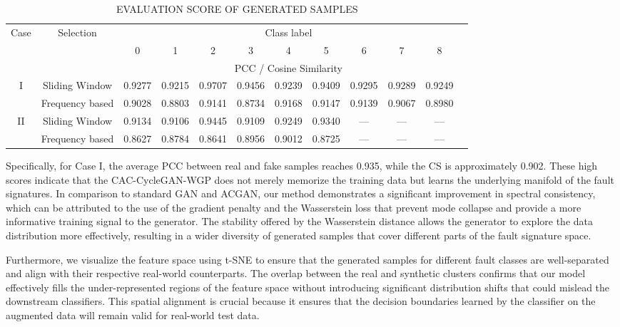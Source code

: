 \documentclass[twocolumn]{IEEEtran}
\begin{document}
\begin{table}[htbp]
\centering
\caption{EVALUATION SCORE OF GENERATED SAMPLES}
\label{tab:similarity}
\begin{tabular}{cccccccccccc}
\hline
\multirow{2}{*}{Case} & \multirow{2}{*}{Selection} & \multicolumn{9}{c}{Class label} \\
 & & 0 & 1 & 2 & 3 & 4 & 5 & 6 & 7 & 8 \\
\cline{3-11}
 & & \multicolumn{9}{c}{PCC / Cosine Similarity} \\
\hline
I & Sliding Window & 0.9277 & 0.9215 & 0.9707 & 0.9456 & 0.9239 & 0.9409 & 0.9295 & 0.9289 & 0.9249 \\
 & Frequency based & 0.9028 & 0.8803 & 0.9141 & 0.8734 & 0.9168 & 0.9147 & 0.9139 & 0.9067 & 0.8980 \\
II & Sliding Window & 0.9134 & 0.9106 & 0.9445 & 0.9109 & 0.9249 & 0.9340 & --- & --- & --- \\
 & Frequency based & 0.8627 & 0.8784 & 0.8641 & 0.8956 & 0.9012 & 0.8725 & --- & --- & --- \\
\hline
\end{tabular}
\end{table}
Specifically, for Case I, the average PCC between real and fake samples reaches 0.935, while the CS is approximately 0.902. These high scores indicate that the CAC-CycleGAN-WGP does not merely memorize the training data but learns the underlying manifold of the fault signatures. In comparison to standard GAN and ACGAN, our method demonstrates a significant improvement in spectral consistency, which can be attributed to the use of the gradient penalty and the Wasserstein loss that prevent mode collapse and provide a more informative training signal to the generator. The stability offered by the Wasserstein distance allows the generator to explore the data distribution more effectively, resulting in a wider diversity of generated samples that cover different parts of the fault signature space.

Furthermore, we visualize the feature space using t-SNE \cite{Maaten2008} to ensure that the generated samples for different fault classes are well-separated and align with their respective real-world counterparts. The overlap between the real and synthetic clusters confirms that our model effectively fills the under-represented regions of the feature space without introducing significant distribution shifts that could mislead the downstream classifiers. This spatial alignment is crucial because it ensures that the decision boundaries learned by the classifier on the augmented data will remain valid for real-world test data.
\end{document}

